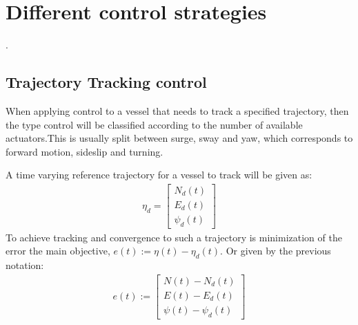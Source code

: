 \chapter{Different control strategies}

.


\section{Trajectory Tracking control}
When applying control to a vessel that needs to track a specified trajectory, then the type control will be classified according to the number of available actuators.This is usually split between surge, sway and yaw, which corresponds to forward motion, sideslip and turning.

A time varying reference trajectory for a vessel to track will be given as:
\begin{align}
\eta_d=
\begin{bmatrix}
N_d(t)\\
E_d(t)\\
\psi_d(t)
\end{bmatrix}
\end{align}
To achieve tracking and convergence to such a trajectory is minimization of the error the main objective, $e(t):=\eta(t)-\eta_d(t)$. Or given by the previous notation:
\begin{align}
e(t):=
\begin{bmatrix}
N(t)-N_d(t)\\
E(t)-E_d(t)\\
\psi(t)-\psi_d(t)
\end{bmatrix}
\end{align}

